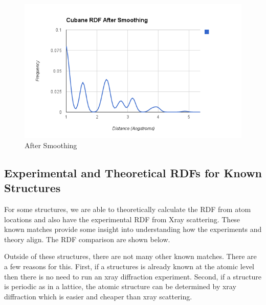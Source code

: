 \documentclass[12pt,letterpaper]{article}
\begin{document}
\begin{figure}[ht!]
  \begin{center}
    \includegraphics[scale=0.7]{figs/cubane_rdf_after_smoothing.png}
    \caption{After Smoothing}
  \end{center}
\end{figure}
\clearpage

\subsection{Experimental and Theoretical RDFs for Known Structures}
For some structures, we are able to theoretically calculate the RDF from atom
locations and also have the experimental RDF from Xray scattering. These known
matches provide some insight into understanding how the experiments and theory
align. The RDF comparison are shown below.

Outside of these structures, there are not many other known matches. There are a
few reasons for this. First, if a structures is already known at the atomic
level then there is no need to run an xray diffraction experiment. Second, if a
structure is periodic as in a lattice, the atomic structure can be determined by
xray diffraction which is easier and cheaper than xray scattering.
\end{document}
